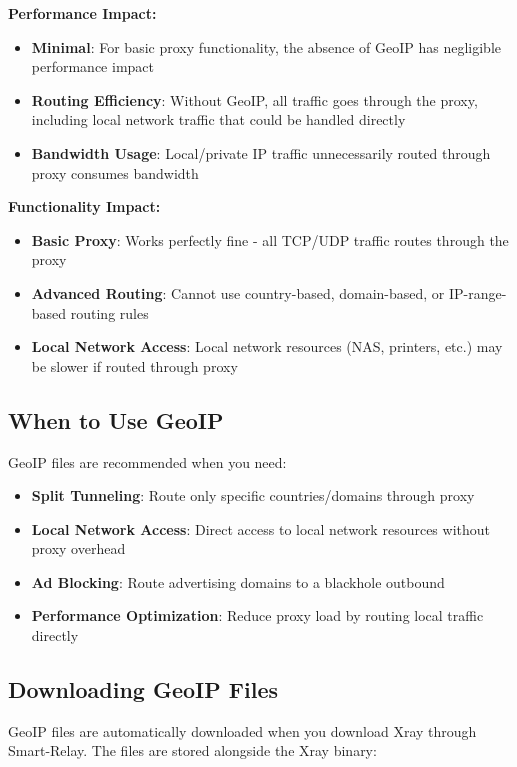 \textbf{Performance Impact:}
\begin{itemize}
    \item \textbf{Minimal}: For basic proxy functionality, the absence of GeoIP has negligible performance impact
    \item \textbf{Routing Efficiency}: Without GeoIP, all traffic goes through the proxy, including local network traffic that could be handled directly
    \item \textbf{Bandwidth Usage}: Local/private IP traffic unnecessarily routed through proxy consumes bandwidth
\end{itemize}

\textbf{Functionality Impact:}
\begin{itemize}
    \item \textbf{Basic Proxy}: Works perfectly fine - all TCP/UDP traffic routes through the proxy
    \item \textbf{Advanced Routing}: Cannot use country-based, domain-based, or IP-range-based routing rules
    \item \textbf{Local Network Access}: Local network resources (NAS, printers, etc.) may be slower if routed through proxy
\end{itemize}

\subsection{When to Use GeoIP}

GeoIP files are recommended when you need:

\begin{itemize}
    \item \textbf{Split Tunneling}: Route only specific countries/domains through proxy
    \item \textbf{Local Network Access}: Direct access to local network resources without proxy overhead
    \item \textbf{Ad Blocking}: Route advertising domains to a blackhole outbound
    \item \textbf{Performance Optimization}: Reduce proxy load by routing local traffic directly
\end{itemize}

\subsection{Downloading GeoIP Files}

GeoIP files are automatically downloaded when you download Xray through Smart-Relay. The files are stored alongside the Xray binary:

